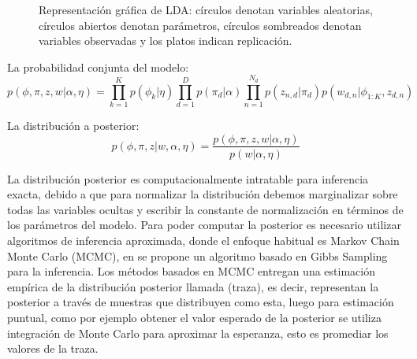 \documentclass[letterpaper,12pt,oneside]{book} %
\begin{document}
\begin{figure}
  \centering
\caption{Representación gráfica de LDA: círculos denotan variables aleatorias, círculos abiertos denotan parámetros, círculos sombreados denotan variables observadas y los platos indican replicación.}
\label{img:lda}
\end{figure}

La probabilidad conjunta del modelo:
\begin{equation}
    p(\phi, \pi, z, w|\alpha, \eta)= \prod_{k=1}^{K}p(\phi_{k}|\eta)\prod_{d=1}^{D}p(\pi_{d}|\alpha)\prod_{n=1}^{N_{d}}p(z_{n,d}|\pi_{d})p(w_{d,n}|\phi_{1:K}, z_{d,n})
\end{equation}

La distribución a posterior:
\begin{equation}
    p(\phi, \pi, z|w, \alpha, \eta) = \frac{p(\phi, \pi, z, w|\alpha, \eta)}{p(w|\alpha, \eta)}
\end{equation}

La distribución posterior es computacionalmente intratable para inferencia exacta, debido a que para normalizar la distribución debemos marginalizar sobre todas las variables ocultas y escribir la constante de normalización en términos de los parámetros del modelo. Para poder computar la posterior es necesario utilizar algoritmos de inferencia aproximada, donde el enfoque habitual es Markov Chain Monte Carlo (MCMC), en \citep{griffiths2004finding} se propone un algoritmo basado en Gibbs Sampling para la inferencia. Los métodos basados en MCMC entregan una estimación empírica de la distribución posterior llamada (traza), es decir, representan la posterior a través de muestras que distribuyen como esta, luego para estimación puntual, como por ejemplo obtener el valor esperado de la posterior se utiliza integración de Monte Carlo para aproximar la esperanza, esto es promediar los valores de la traza.
\end{document}
